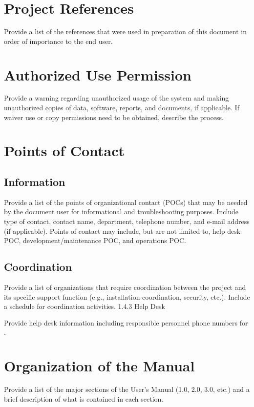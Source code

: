\documentclass[10pt,letterpaper,extrafontsizes]{memoir}
\begin{document}
\section{Project References}

Provide a list of the references that were used in preparation of this document in order of importance to the end user.
\section{Authorized Use Permission}

Provide a warning regarding unauthorized usage of the system and making unauthorized copies of data, software, reports, and documents, if applicable.  If waiver use or copy permissions need to be obtained, describe the process.
\section{Points of Contact}

\subsection{Information}

Provide a list of the points of organizational contact (POCs) that may be needed by the document user for informational and troubleshooting purposes.  Include type of contact, contact name, department, telephone number, and e-mail address (if applicable).  Points of contact may include, but are not limited to, help desk POC, development/maintenance POC, and operations POC.
\subsection{Coordination}

Provide a list of organizations that require coordination between the project and its specific support function (e.g., installation coordination, security, etc.).  Include a schedule for coordination activities.
1.4.3	Help Desk

Provide help desk information including responsible personnel phone numbers for  .
\section{Organization of the Manual}

Provide a list of the major sections of the User's Manual (1.0, 2.0, 3.0, etc.) and a brief description of what is contained in each section.
\end{document}
